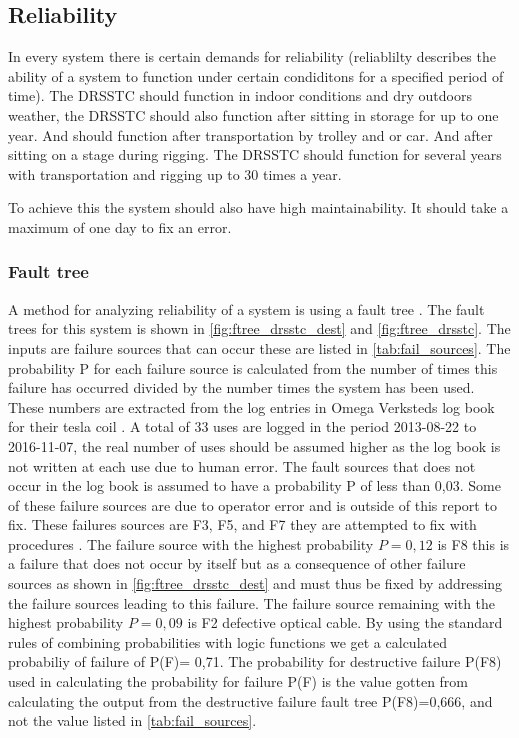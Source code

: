 \subsection{Reliability}
\label{reliability}
In every system there is certain demands for reliability (reliablilty describes the ability of a system to function under certain condiditons for a specified period of time). The DRSSTC should function in indoor conditions and dry outdoors weather, the DRSSTC should also function after sitting in storage for up to one year. And should function after transportation by trolley and or car. And after sitting on a stage during rigging. The DRSSTC should function for several years with transportation and rigging up to 30 times a year.

To achieve this the system should also have high maintainability. It should take a maximum of one day to fix an error.

\subsubsection{Fault tree}
A method for analyzing reliability of a system is using a fault tree \citep{faulttree}. The fault trees for this system is shown in \cref{fig:ftree_drsstc_dest} and \cref{fig:ftree_drsstc}. The inputs are failure sources that can occur these are listed in \cref{tab:fail_sources}. The probability P for each failure source is calculated from the number of times this failure has occurred divided by the number times the system has been used. These numbers are extracted from the log entries in Omega Verksteds log book for their tesla coil \citep{teslalog}. A total of 33 uses are logged in the period 2013-08-22 to 2016-11-07, the real number of uses should be assumed higher as the log book is not written at each use due to human error. The fault sources that does not occur in the log book is assumed to have a probability P of less than 0,03. Some of these failure sources are due to operator error and is outside of this report to fix. These failures sources are F3, F5, and F7 they are attempted to fix with procedures \citep{teslaprosedyrer}. The failure source with the highest probability $P=0,12$ is F8 this is a failure that does not occur by itself but as a consequence of other failure sources as shown in \cref{fig:ftree_drsstc_dest} and must thus be fixed by addressing the failure sources leading to this failure. The failure source remaining with the highest probability $P=0,09$ is F2 defective optical cable. By using the standard rules of combining probabilities with logic functions we get a calculated probabiliy of failure of P(F)= 0,71. The probability for destructive failure P(F8) used in calculating the probability for failure P(F) is the value gotten from calculating the output from the destructive failure fault tree P(F8)=0,666, and not the value listed in \cref{tab:fail_sources}.

